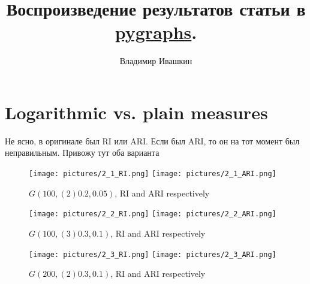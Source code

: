 \documentclass{article}
\title{
        Воспроизведение результатов статьи в \href{https://github.com/illusionww/pygraphs}{pygraphs}.
}
\author{Владимир Ивашкин}
\begin{document}
\maketitle

\setcounter{section}{1}

\section{Logarithmic vs. plain measures}

Не ясно, в оригинале был RI или ARI. Если был ARI, то он на тот момент был неправильным. Привожу тут оба варианта

\begin{figure}[H]
	\texttt{[image: pictures/2\_1\_RI.png]}
	\texttt{[image: pictures/2\_1\_ARI.png]}
	\caption{\label{f_2_1} $G(100, (2)0.2, 0.05)$, RI and ARI respectively}
\end{figure}

\begin{figure}[H]
	\texttt{[image: pictures/2\_2\_RI.png]}
	\texttt{[image: pictures/2\_2\_ARI.png]}
	\caption{\label{f_2_2} $G(100, (3)0.3, 0.1)$, RI and ARI respectively}
\end{figure}


\begin{figure}[H]
	\texttt{[image: pictures/2\_3\_RI.png]}
	\texttt{[image: pictures/2\_3\_ARI.png]}
	\caption{\label{f_2_3} $G(200, (2)0.3, 0.1)$, RI and ARI respectively}
\end{figure}

\nopagebreak


\newpage
\end{document}
